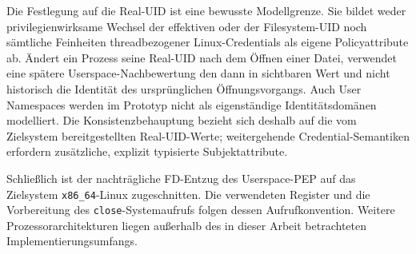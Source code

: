 Die Festlegung auf die Real-UID ist eine bewusste Modellgrenze. Sie bildet weder privilegienwirksame Wechsel der effektiven oder der Filesystem-UID noch sämtliche Feinheiten threadbezogener Linux-Credentials als eigene Policyattribute ab. Ändert ein Prozess seine Real-UID nach dem Öffnen einer Datei, verwendet eine spätere Userspace-Nachbewertung den dann in  sichtbaren Wert und nicht historisch die Identität des ursprünglichen Öffnungsvorgangs. Auch User Namespaces werden im Prototyp nicht als eigenständige Identitätsdomänen modelliert. Die Konsistenzbehauptung bezieht sich deshalb auf die vom Zielsystem bereitgestellten Real-UID-Werte; weitergehende Credential-Semantiken erfordern zusätzliche, explizit typisierte Subjektattribute.

Schließlich ist der nachträgliche FD-Entzug des Userspace-PEP auf das Zielsystem \texttt{x86\_64}-Linux zugeschnitten. Die verwendeten Register und die Vorbereitung des \texttt{close}-Systemaufrufs folgen dessen Aufrufkonvention. Weitere Prozessorarchitekturen liegen außerhalb des in dieser Arbeit betrachteten Implementierungsumfangs.

\newpage
